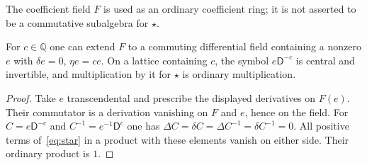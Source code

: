 \documentclass{article}
\newcommand{\DD}{\mathsf D}
\begin{document}
The coefficient field $F$ is used as an ordinary coefficient ring; it is not asserted to be a commutative subalgebra for $\star$.

\begin{lemma}\label{lem:twist}
For $c\in\mathbb Q$ one can extend $F$ to a commuting differential field containing a nonzero $e$ with $\delta e=0$, $\eta e=ce$. On a lattice containing $c$, the symbol $e\DD^{-c}$ is central and invertible, and multiplication by it for $\star$ is ordinary multiplication.
\end{lemma}
\begin{proof}
Take $e$ transcendental and prescribe the displayed derivatives on $F(e)$. Their commutator is a derivation vanishing on $F$ and $e$, hence on the field. For $C=e\DD^{-c}$ and $C^{-1}=e^{-1}\DD^c$ one has
$\Delta C=\delta C=\Delta C^{-1}=\delta C^{-1}=0$. All positive terms of~\eqref{eq:star} in a product with these elements vanish on either side. Their ordinary product is $1$.
\end{proof}
\end{document}
